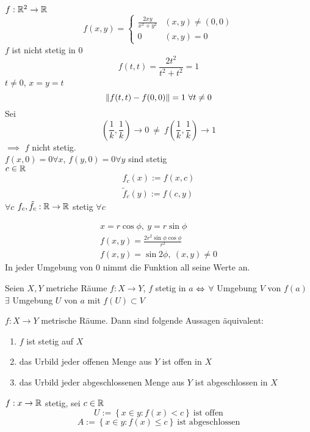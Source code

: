 \begin{Bsp}
  $f:\mathbb{R}^2\to\mathbb{R}$
  \[f(x,y)=\begin{cases}
    \frac{2xy}{x^2+y^2}&(x,y)\neq(0,0)\\ 0&(x,y)=0
  \end{cases}\]
  $f$ ist nicht stetig in $0$
  \[f(t,t)=\frac{2t^2}{t^2+t^2}=1\]
  $t\neq 0$, $x=y=t$
  \[\left\| f(t,t)-f(0,0) \right\|=1\ \forall t\neq 0\]
  Sei \[\left( \frac{1}{k},\frac{1}{k} \right)\to 0\ \neq\ f\left(\frac{1}{k},\frac{1}{k}\right)\to 1\] $\implies$ $f$ nicht stetig.\\
  $f(x,0)=0 \forall x$, $f(y,0)=0 \forall y$ sind stetig\\
  $c\in \mathbb{R}$
  \begin{gather*}
    f_c(x):=f(x,c)\\
    \tilde f_c(y):=f(c,y)
  \end{gather*}
  $\forall c$ $f_c,\tilde f_c:\mathbb{R}\to\mathbb{R}$ stetig $\forall c$
\end{Bsp}
\begin{Bsp}
  \begin{gather*}
    x=r\cos\phi,\ y=r\sin\phi\\
    f(x,y)=\frac{2r^2\sin\phi\cos\phi}{r^2}\\
    f(x,y)=\sin2\phi,\ (x,y)\neq 0
  \end{gather*}
  In jeder Umgebung von 0 nimmt die Funktion all seine Werte an.
\end{Bsp}
\begin{Sat}
  Seien $X,Y$ metriche Räume $f:X\to Y$, $f$ stetig in $a$ $\Leftrightarrow$ $\forall$ Umgebung $V$ von $f(a)$ $\exists$ Umgebung $U$ von $a$ mit $f(U)\subset V$
\end{Sat}
\begin{Kor}
  $f:X\to Y$ metrische Räume. Dann sind folgende Aussagen äquivalent:
  \begin{enumerate}
    \item $f$ ist stetig auf $X$
    \item das Urbild jeder offenen Menge aus $Y$ ist offen in $X$
    \item das Urbild jeder abgeschlossenen Menge aus $Y$ ist abgeschlossen in $X$
  \end{enumerate}
\end{Kor}
\begin{Kor}
  $f:x\to\mathbb{R}$ stetig, sei $c\in\mathbb{R}$
  \[U:=\left\{ x\in y: f(x)<c \right\}\ \text{ist offen}\]
  \[A:=\left\{ x\in y: f(x)\leq c \right\}\ \text{ist abgeschlossen}\]
\end{Kor}

